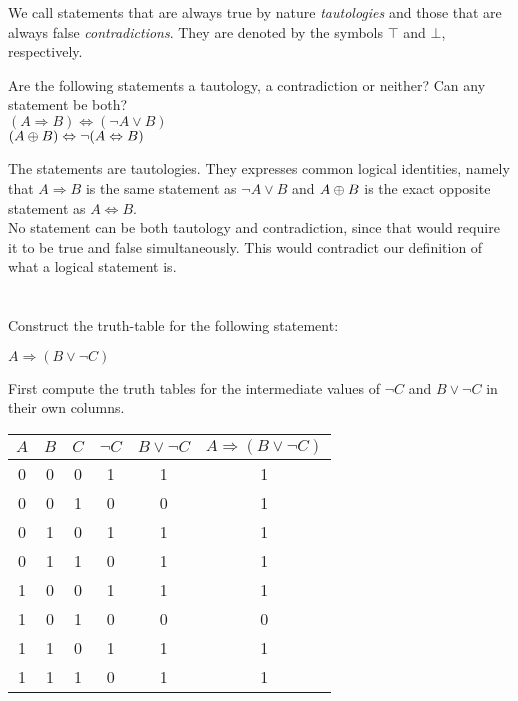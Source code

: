 We call statements that are always true by nature \emph{tautologies} and
those that are always false \emph{contradictions}. They are denoted by the
symbols \(\top\) and \(\bot\), respectively.

\begin{exercise}
  Are the following statements a tautology, a contradiction or neither?
  Can any statement be both?\\
  \((A \Rightarrow B) \Leftrightarrow (\neg A \lor B)\)\\
  \((A \oplus B) \Leftrightarrow \neg (A \Leftrightarrow B)\)

  \begin{sol}
    The statements are tautologies. They expresses common logical identities, namely
    that \(A \Rightarrow B\) is the same statement as \(\neg A \lor B\)
    and \(A \oplus B\) is the exact opposite statement as \(A \Leftrightarrow B\).\\
    No statement can be both tautology and contradiction, since that would
    require it to be true and false simultaneously. This would contradict our
    definition of what a logical statement is.
  \end{sol}
\end{exercise}

\section{\problemhead}
\begin{problem}
  Construct the truth-table for the following statement:\\
  \begin{center}
    \(A \Rightarrow (B \lor \neg C)\)
  \end{center}

  \begin{hint}
    First compute the truth tables for the intermediate values of \(\neg C\) and
    \(B \lor \neg C\) in their own columns.
  \end{hint}

  \begin{sol}
    \begin{tabular}{ccc cc c}
      \(A\) & \(B\) & \(C\) & \(\neg C\) & \(B \lor \neg C\) &
      \(A \Rightarrow (B \lor \neg C)\)\\
      \midrule
      0 & 0 & 0 & 1 & 1 & 1\\
      0 & 0 & 1 & 0 & 0 & 1\\
      0 & 1 & 0 & 1 & 1 & 1\\
      0 & 1 & 1 & 0 & 1 & 1\\
      1 & 0 & 0 & 1 & 1 & 1\\
      1 & 0 & 1 & 0 & 0 & 0\\
      1 & 1 & 0 & 1 & 1 & 1\\
      1 & 1 & 1 & 0 & 1 & 1\\
    \end{tabular}
  \end{sol}
\end{problem}
